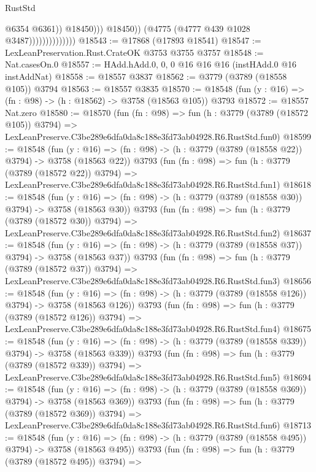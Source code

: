 \begin{lexlean}{RustStd}
\begin{coremodule}
                                          @6354
                                          @6361))
                                      @18450)))
                                @18450))
                            (@4775 (@4777 @439 @1028 @3487))))))))))))))
@18543 := @17868 (@17893 @18541)
@18547 := LexLeanPreservation.Rust.CrateOK @3753 @3755 @3757
@18548 := Nat.casesOn.{0}
@18557 := HAdd.hAdd.{0, 0, 0} @16 @16 @16 (instHAdd.{0} @16 instAddNat)
@18558 := @18557 @3837
@18562 := @3779 (@3789 (@18558 @105)) @3794
@18563 := @18557 @3835
@18570 := @18548 (fun (y : @16) => (fn : @98) -> (h : @18562) -> @3758 (@18563 @105)) @3793
@18572 := @18557 Nat.zero
@18580 := @18570
    (fun (fn : @98) =>
    fun (h : @3779 (@3789 (@18572 @105)) @3794) =>
    LexLeanPreserve.C3be289e6dfa0da8c188e3fd73ab04928.R6.RustStd.fun0)
@18599 := @18548
    (fun (y : @16) => (fn : @98) -> (h : @3779 (@3789 (@18558 @22)) @3794) -> @3758 (@18563 @22))
    @3793
    (fun (fn : @98) =>
    fun (h : @3779 (@3789 (@18572 @22)) @3794) =>
    LexLeanPreserve.C3be289e6dfa0da8c188e3fd73ab04928.R6.RustStd.fun1)
@18618 := @18548
    (fun (y : @16) => (fn : @98) -> (h : @3779 (@3789 (@18558 @30)) @3794) -> @3758 (@18563 @30))
    @3793
    (fun (fn : @98) =>
    fun (h : @3779 (@3789 (@18572 @30)) @3794) =>
    LexLeanPreserve.C3be289e6dfa0da8c188e3fd73ab04928.R6.RustStd.fun2)
@18637 := @18548
    (fun (y : @16) => (fn : @98) -> (h : @3779 (@3789 (@18558 @37)) @3794) -> @3758 (@18563 @37))
    @3793
    (fun (fn : @98) =>
    fun (h : @3779 (@3789 (@18572 @37)) @3794) =>
    LexLeanPreserve.C3be289e6dfa0da8c188e3fd73ab04928.R6.RustStd.fun3)
@18656 := @18548
    (fun (y : @16) => (fn : @98) -> (h : @3779 (@3789 (@18558 @126)) @3794) -> @3758 (@18563 @126))
    @3793
    (fun (fn : @98) =>
    fun (h : @3779 (@3789 (@18572 @126)) @3794) =>
    LexLeanPreserve.C3be289e6dfa0da8c188e3fd73ab04928.R6.RustStd.fun4)
@18675 := @18548
    (fun (y : @16) => (fn : @98) -> (h : @3779 (@3789 (@18558 @339)) @3794) -> @3758 (@18563 @339))
    @3793
    (fun (fn : @98) =>
    fun (h : @3779 (@3789 (@18572 @339)) @3794) =>
    LexLeanPreserve.C3be289e6dfa0da8c188e3fd73ab04928.R6.RustStd.fun5)
@18694 := @18548
    (fun (y : @16) => (fn : @98) -> (h : @3779 (@3789 (@18558 @369)) @3794) -> @3758 (@18563 @369))
    @3793
    (fun (fn : @98) =>
    fun (h : @3779 (@3789 (@18572 @369)) @3794) =>
    LexLeanPreserve.C3be289e6dfa0da8c188e3fd73ab04928.R6.RustStd.fun6)
@18713 := @18548
    (fun (y : @16) => (fn : @98) -> (h : @3779 (@3789 (@18558 @495)) @3794) -> @3758 (@18563 @495))
    @3793
    (fun (fn : @98) =>
    fun (h : @3779 (@3789 (@18572 @495)) @3794) =>

\end{coremodule}
\end{lexlean}
